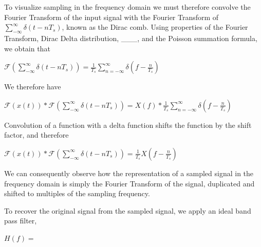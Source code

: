 \documentclass{article}
\begin{document}
To visualize sampling in the frequency domain we must therefore convolve the Fourier Transform of the input signal with the Fourier Transform of $\sum_{-\infty}^{\infty} \delta (t-nT_s)$, known as the Dirac comb. %
Using properties of the Fourier Transform, Dirac Delta distribution, \_\_\_, %
and the Poisson summation formula, 
we obtain that 
\begin{center}
    \begin{math}
        \mathcal{F}\left(\sum_{-\infty}^{\infty} \delta (t-nT_s)\right) = \frac{1}{T_s} \sum_{n = -\infty}^{\infty} \delta \left( f - \frac{n}{T_s} \right)
    \end{math}  
\end{center}
We therefore have
\begin{center}
    \begin{math}
        \mathcal{F}(x(t)) * \mathcal{F}\left( \sum_{-\infty}^{\infty} \delta (t-nT_s) \right) = X(f) * \frac{1}{T_s} \sum_{n = -\infty}^{\infty} \delta \left( f - \frac{n}{T_s} \right)
    \end{math}  
\end{center}
Convolution of a function with a delta function shifts the function by the shift factor, and therefore %
\begin{center}
    \begin{math}
        \mathcal{F}(x(t)) * \mathcal{F}\left( \sum_{-\infty}^{\infty} \delta (t-nT_s) \right) = \frac{1}{T_s} X\left(f - \frac{n}{T_s} \right)
    \end{math}  
\end{center}
We can consequently observe how the representation of a sampled signal in the frequency domain is simply the Fourier Transform of the signal, duplicated and shifted to multiples of the sampling frequency. %

To recover the original signal from the sampled signal, we apply an ideal band pass filter,
\begin{center}
    \begin{math}
        H(f) = %
    \end{math}  
\end{center}

\end{document}
